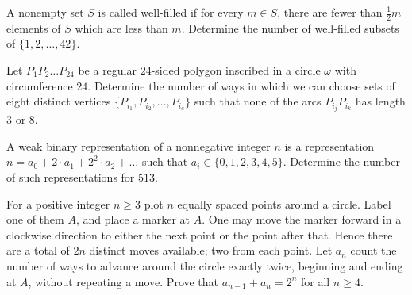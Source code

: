 \documentclass[11pt]{article}
\begin{document}
\begin{prob}[HMMT 2016 T6]{9}
A nonempty set $S$ is called well-filled if for every $m \in S$, there are fewer than $\frac{1}{2} m$ elements of $S$ which are less than $m$. Determine the number of well-filled subsets of $\{1,2, \ldots, 42\}$.
\end{prob}

\begin{prob}{9}
Let $P_1P_2\ldots P_{24}$ be
a regular $24$-sided polygon inscribed in a circle $\omega$ with circumference 
$24.$ Determine the number of ways in which we can choose sets of
eight distinct vertices $\{P_{i_1} , P_{i_2}
,\ldots , P_{i_a }\}$ such that none of the arcs
$P_{i_j}P_{i_k}$ has length $3$ or $8.$ 
\end{prob}

\begin{prob}[PUMaC 2019 A/6]{13}

A weak binary representation of a nonnegative integer $n$ is a representation $n=a_0+2\cdot a_1+2^2\cdot a_2+\dots$ such that $a_i\in\{0,1,2,3,4,5\}$. Determine the number of such representations for $513$.
\end{prob}


{For a positive integer $n\geq 3$ plot $n$ equally spaced points around a circle.  Label one of them $A$, and place a marker at $A$.  One may move the marker forward in a clockwise direction to either the next point or the point after that.  Hence there are a total of $2n$ distinct moves available; two from each point.  Let $a_n$ count the number of ways to advance around the circle exactly twice, beginning and ending at $A$, without repeating a move.  Prove that $a_{n-1}+a_n=2^n$ for all $n\geq 4$.}

%
%        
%        
\end{document}
